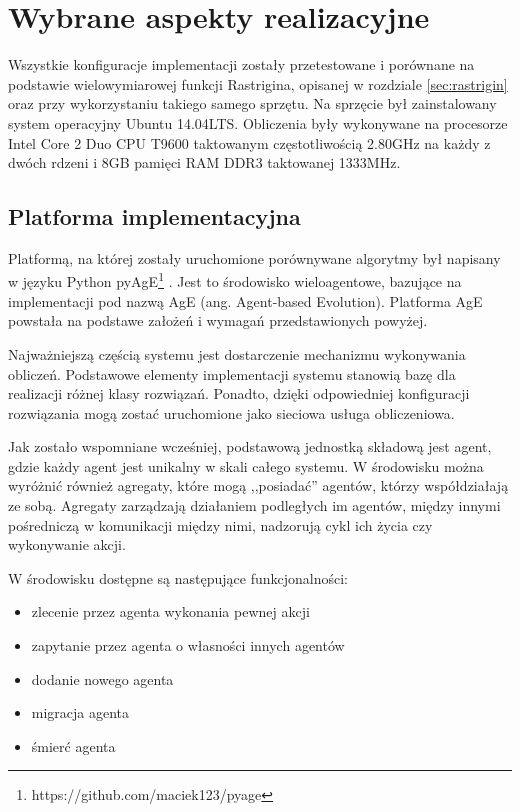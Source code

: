 \chapter{Wybrane aspekty realizacyjne}
\label{cha:ewaluacja}

Wszystkie konfiguracje implementacji zostały przetestowane i porównane na podstawie wielowymiarowej funkcji Rastrigina, opisanej w rozdziale \ref{sec:rastrigin} oraz przy wykorzystaniu takiego samego sprzętu. Na sprzęcie był zainstalowany system operacyjny Ubuntu 14.04LTS. Obliczenia były wykonywane na procesorze Intel Core 2 Duo CPU T9600 taktowanym częstotliwością 2.80GHz na każdy z dwóch rdzeni i 8GB pamięci RAM DDR3 taktowanej 1333MHz.

\section{Platforma implementacyjna}
\label{sec:pyageopis}
Platformą, na której zostały uruchomione porównywane algorytmy był napisany w języku Python pyAgE\footnote{https://github.com/maciek123/pyage} \cite{pyage}. Jest to środowisko wieloagentowe, bazujące na implementacji pod nazwą AgE (ang. Agent-based Evolution). Platforma AgE powstała na podstawe założeń i wymagań przedstawionych powyżej.

Najważniejszą częścią systemu jest dostarczenie mechanizmu wykonywania obliczeń. Podstawowe elementy implementacji systemu stanowią bazę dla realizacji różnej klasy rozwiązań. Ponadto, dzięki odpowiedniej konfiguracji rozwiązania mogą zostać uruchomione jako sieciowa usługa obliczeniowa.

Jak zostało wspomniane wcześniej, podstawową jednostką składową jest agent, gdzie każdy agent jest unikalny w skali całego systemu. W środowisku można wyróżnić również agregaty, które mogą ,,posiadać'' agentów, którzy współdziałają ze sobą. Agregaty zarządzają działaniem podległych im agentów, między innymi pośredniczą w komunikacji między nimi, nadzorują cykl ich życia czy wykonywanie akcji.

W środowisku dostępne są następujące funkcjonalności:
\begin{itemize}
\item zlecenie przez agenta wykonania pewnej akcji
\item zapytanie przez agenta o własności innych agentów
\item dodanie nowego agenta
\item migracja agenta
\item śmierć agenta
\end{itemize}

